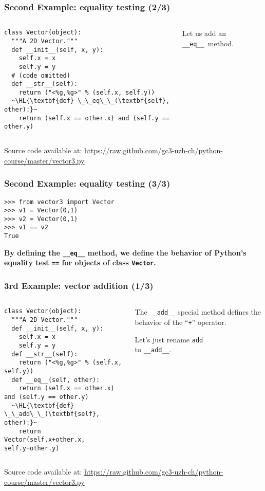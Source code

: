 \documentclass[english,serif,mathserif,xcolor=pdftex,dvipsnames,table]{beamer}
\begin{document}
\begin{frame}[fragile]
  \frametitle{Second Example: equality testing (2/3)}
  \begin{columns}[t]
    \begin{column}{0.5\textwidth}
\begin{lstlisting}
class Vector(object):
  """A 2D Vector."""
  def __init__(self, x, y):
    self.x = x
    self.y = y
  # (code omitted)
  def __str__(self):
    return ("<%g,%g>" % (self.x, self.y))
  ~\HL{\textbf{def} \_\_eq\_\_(\textbf{self}, other):}~
    return (self.x == other.x) and (self.y == other.y)
\end{lstlisting}
    \end{column}
    \begin{column}{0.5\textwidth}
      \raggedleft
      Let us add an \lstinline|__eq__|~method.
    \end{column}
  \end{columns}

  \+
  {\scriptsize Source code available at:
    \url{https://raw.github.com/gc3-uzh-ch/python-course/master/vector3.py}}
\end{frame}


\begin{frame}[fragile]
  \frametitle{Second Example: equality testing (3/3)}
\begin{lstlisting}
>>> from vector3 import Vector
>>> v1 = Vector(0,1)
>>> v2 = Vector(0,1)
>>> v1 == v2
True
\end{lstlisting}

  \+ {\bfseries By defining the \lstinline|__eq__| method, we
    define the behavior of Python's equality test \lstinline|==| for
    objects of class \texttt{Vector}.}
\end{frame}


\begin{frame}[fragile]
  \frametitle{3rd Example: vector addition (1/3)}
  \begin{columns}[t]
    \begin{column}{0.5\textwidth}
\begin{lstlisting}
class Vector(object):
  """A 2D Vector."""
  def __init__(self, x, y):
    self.x = x
    self.y = y
  def __str__(self):
    return ("<%g,%g>" % (self.x, self.y))
  def __eq__(self, other):
    return (self.x == other.x) and (self.y == other.y)
  ~\HL{\textbf{def} \_\_add\_\_(\textbf{self}, other):}~
    return Vector(self.x+other.x, self.y+other.y)
\end{lstlisting}
    \end{column}
    \begin{column}{0.5\textwidth}
      \raggedleft
      The \lstinline|__add__| special method defines the behavior of the
      ``\texttt{+}'' operator.

      \+
      Let's just rename \texttt{add} \\ to \texttt{\_\_add\_\_}.
    \end{column}
  \end{columns}

  \+
  {\scriptsize Source code available at:
    \url{https://raw.github.com/gc3-uzh-ch/python-course/master/vector3.py}}
\end{frame}
\end{document}
